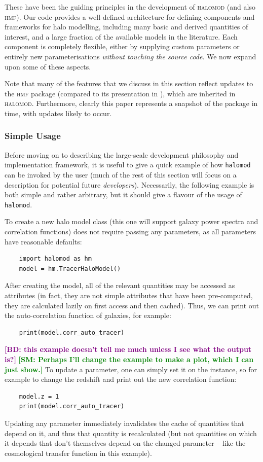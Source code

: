 \documentclass[5p]{elsarticle}
\newcommand{\bd}[1]{\textcolor{purple}{\textbf{[BD: #1]}}}
\newcommand{\sgm}[1]{\textcolor{green}{\textbf{[SM: #1]}}}
\begin{document}
These have been the guiding principles in the development of \textsc{halomod} (and also \textsc{hmf}). Our code provides a well-defined architecture for defining components and frameworks for halo modelling, including many basic and derived quantities of interest, and a large fraction of the available models in the literature. Each component is completely flexible, either by supplying custom parameters or entirely new parameterisations \textit{without touching the source code}. We now expand upon some of these aspects.

Note that many of the features that we discuss in this section reflect updates to the \textsc{hmf} package (compared to its presentation in \citet{Murray2013}), which are inherited in \textsc{halomod}. Furthermore, clearly this paper represents a snapshot of the package in time, with updates likely to occur. 

\subsubsection{Simple Usage}
\label{sec:halomod:overview:usage}
Before moving on to describing the large-scale development philosophy and implementation framework, it is useful to give a quick example of how \verb|halomod| can be invoked by the user (much of the rest of this section will focus on a description for potential future \textit{developers}). 
Necessarily, the following example is both simple and rather arbitrary, but it should give a flavour of the usage of \verb|halomod|.

To create a new halo model class (this one will support galaxy power spectra and correlation functions) does not require passing any parameters, as all parameters have reasonable defaults:
\begin{lstlisting}
    import halomod as hm
    model = hm.TracerHaloModel()
\end{lstlisting}

After creating the model, all of the relevant quantities may be accessed as attributes (in fact, they are not simple attributes that have been pre-computed, they are calculated lazily on first access and then cached).
Thus, we can print out the auto-correlation function of galaxies, for example:
\begin{lstlisting}
    print(model.corr_auto_tracer)
\end{lstlisting}
\bd{this example doesn't tell me much unless I see what the output is?}
\sgm{Perhaps I'll change the example to make a plot, which I can just show.}
To update a parameter, one can simply set it on the instance, so for example to change the redshift and print out the new correlation function:
\begin{lstlisting}
    model.z = 1
    print(model.corr_auto_tracer)
\end{lstlisting}
Updating any parameter immediately invalidates the cache of quantities that depend on it, and thus that quantity is recalculated (but not quantities on which it depends that don't themselves depend on the changed parameter -- like the cosmological transfer function in this example). 
\end{document}
